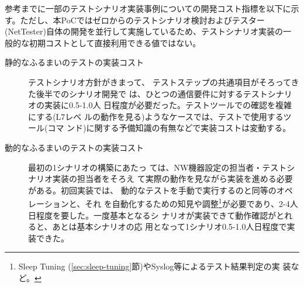 参考までに一部のテストシナリオ実装事例についての開発コスト指標を以下に示
す。ただし、本PoCではゼロからのテストシナリオ検討およびテスター
(NetTester)自体の開発を並行して実施しているため、テストシナリオ実装の一
般的な初期コストとして直接利用できる値ではない。
\begin{description}
 \item[静的なふるまいのテストの実装コスト] テストシナリオ方針がきまって、
            テストステップの共通項目がそろってきた後半でのシナリオ開発で
            は、ひとつの通信要件に対するテストシナリオの実装に0.5-1.0人
            日程度が必要だった。テストツールでの確認を複雑にする(L7レベ
            ルの動作を見る)ようなケースでは、テストで使用するツール(コマ
            ンド)に関する予備知識の有無などで実装コストは変動する。
 \item[動的なふるまいのテストの実装コスト] 最初の1シナリオの構築にあたっ
            ては、NW機器設定の担当者・テストシナリオ実装の担当者をそろえ
            て実際の動作を見ながら実装を進める必要がある。初回実装では、
            動的なテストを手動で実行するのと同等のオペレーションと、それ
            を自動化するための知見や調整\footnote{Sleep Tuning
            (\ref{sec:sleep-tuning}節)やSyslog等によるテスト結果判定の実
            装など。}が必要であり、2-4人日程度を要した。一度基本となるシ
            ナリオが実装できて動作確認がとれると、あとは基本シナリオの応
            用となって1シナリオ0.5-1.0人日程度で実装できた。
\end{description}

